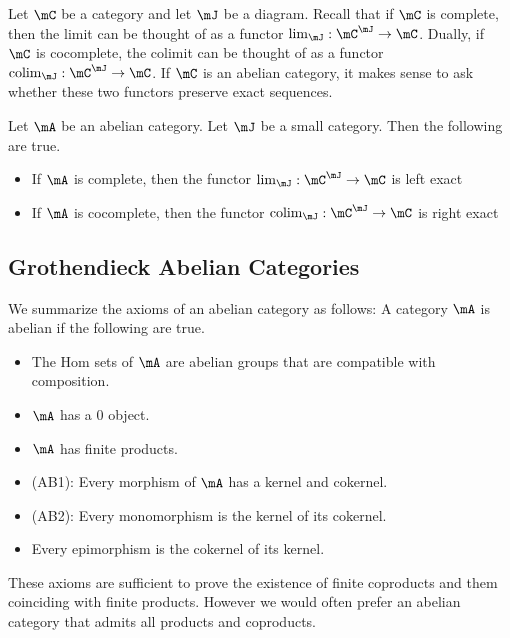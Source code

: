 \documentclass[a4paper]{article}
\begin{document}
Let $\mC$ be a category and let $\mJ$ be a diagram. Recall that if $\mC$ is complete, then the limit can be thought of as a functor $\lim_\mJ:\mC^\mJ\to\mC$. Dually, if $\mC$ is cocomplete, the colimit can be thought of as a functor $\text{colim}_\mJ:\mC^\mJ\to\mC$. If $\mC$ is an abelian category, it makes sense to ask whether these two functors preserve exact sequences. 

\begin{prp}{}{} Let $\mA$ be an abelian category. Let $\mJ$ be a small category. Then the following are true. 
\begin{itemize}
\item If $\mA$ is complete, then the functor $\lim_\mJ:\mC^\mJ\to\mC$ is left exact
\item If $\mA$ is cocomplete, then the functor $\text{colim}_\mJ:\mC^\mJ\to\mC$ is right exact
\end{itemize}
\end{prp}

\subsection{Grothendieck Abelian Categories}
We summarize the axioms of an abelian category as follows: A category $\mA$ is abelian if the following are true. 
\begin{itemize}
\item The Hom sets of $\mA$ are abelian groups that are compatible with composition. 
\item $\mA$ has a $0$ object. 
\item $\mA$ has finite products. 
\item (AB1): Every morphism of $\mA$ has a kernel and cokernel. 
\item (AB2): Every monomorphism is the kernel of its cokernel. 
\item Every epimorphism is the cokernel of its kernel. 
\end{itemize}
These axioms are sufficient to prove the existence of finite coproducts and them coinciding with finite products. However we would often prefer an abelian category that admits all products and coproducts. 
\end{document}
